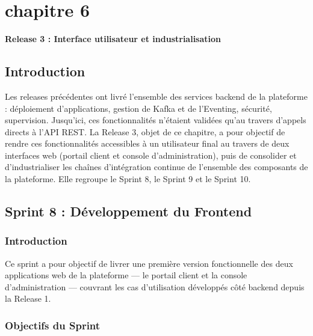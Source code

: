 \chapter*{chapitre 6}

\textbf{\Huge Release 3 : Interface utilisateur et industrialisation}

\setcounter{chapter}{6}
\setcounter{section}{0}

\section{Introduction}

Les releases précédentes ont livré l'ensemble des services backend de la plateforme : déploiement d'applications, gestion de Kafka et de l'Eventing, sécurité, supervision. Jusqu'ici, ces fonctionnalités n'étaient validées qu'au travers d'appels directs à l'API REST. La Release 3, objet de ce chapitre, a pour objectif de rendre ces fonctionnalités accessibles à un utilisateur final au travers de deux interfaces web (portail client et console d'administration), puis de consolider et d'industrialiser les chaînes d'intégration continue de l'ensemble des composants de la plateforme. Elle regroupe le Sprint 8, le Sprint 9 et le Sprint 10.


\section{Sprint 8 : Développement du Frontend}

\subsection{Introduction}

Ce sprint a pour objectif de livrer une première version fonctionnelle des deux applications web de la plateforme — le portail client et la console d'administration — couvrant les cas d'utilisation développés côté backend depuis la Release 1.

\subsection{Objectifs du Sprint}

